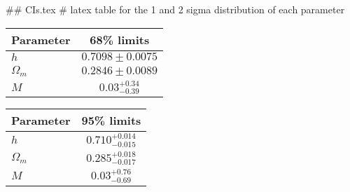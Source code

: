 ## CIs.tex
# latex table for the 1 and 2 sigma distribution of each parameter

\begin{tabular} { l  c}
 Parameter &  68\% limits\\
\hline
{\boldmath$h              $} & $0.7098\pm 0.0075          $\\
{\boldmath$\Omega_m       $} & $0.2846\pm 0.0089          $\\
{\boldmath$M              $} & $0.03^{+0.34}_{-0.39}      $\\
\hline
\end{tabular}

\begin{tabular} { l  c}
 Parameter &  95\% limits\\
\hline
{\boldmath$h              $} & $0.710^{+0.014}_{-0.015}   $\\
{\boldmath$\Omega_m       $} & $0.285^{+0.018}_{-0.017}   $\\
{\boldmath$M              $} & $0.03^{+0.76}_{-0.69}      $\\
\hline
\end{tabular}
